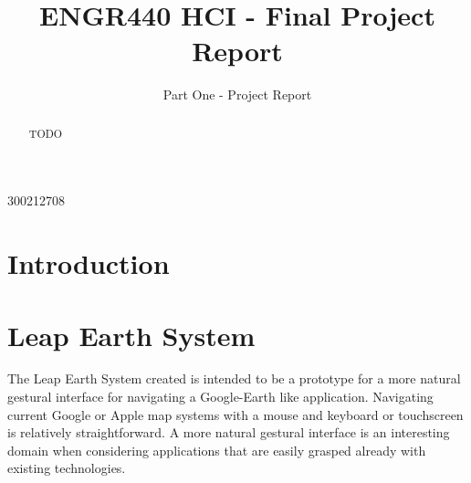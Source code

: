 \documentclass{sigplanconf}
\begin{document}
\setlength{\pdfpageheight}{\paperheight}
\setlength{\pdfpagewidth}{\paperwidth}






\title{ENGR440 HCI - Final Project Report}
\subtitle{Part One - Project Report}

           {300212708}      


\maketitle

\begin{abstract}

TODO

\end{abstract}




\section{Introduction}



\section{Leap Earth System}
\label{sec:leap_system}

The Leap Earth System created is intended to be a prototype for a more natural gestural interface for navigating a Google-Earth like application. Navigating current Google or Apple map systems with a mouse and keyboard or touchscreen is relatively straightforward. A more natural gestural interface is an interesting domain when considering applications that are easily grasped already with existing technologies. 
\end{document}

